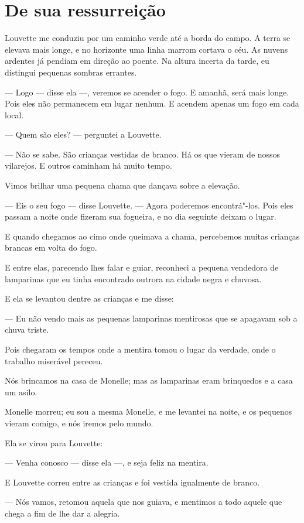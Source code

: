 \section*{De sua ressurreição}

Louvette me conduziu por um caminho verde até a borda do campo. A terra
se elevava mais longe, e no horizonte uma linha marrom cortava o céu. As
nuvens ardentes já pendiam em direção ao poente. Na altura incerta da
tarde, eu distingui pequenas sombras errantes.

--- Logo --- disse ela ---, veremos se acender o fogo. E amanhã, será mais
longe. Pois eles não permanecem em lugar nenhum. E acendem apenas um
fogo em cada local.

--- Quem são eles? --- perguntei a Louvette.

--- Não se sabe. São crianças vestidas de branco. Há os que vieram de
nossos vilarejos. E outros caminham há muito tempo.

Vimos brilhar uma pequena chama que dançava sobre a elevação.

--- Eis o seu fogo --- disse Louvette. --- Agora poderemos encontrá"-los. Pois
eles passam a noite onde fizeram sua fogueira, e no dia seguinte deixam o
lugar.

E quando chegamos ao cimo onde queimava a chama, percebemos muitas
crianças brancas em volta do fogo.

E entre elas, parecendo lhes falar e guiar, reconheci a pequena
vendedora de lamparinas que eu tinha encontrado outrora na cidade negra e
chuvosa.

E ela se levantou dentre as crianças e me disse:

--- Eu não vendo mais as pequenas lamparinas mentirosas que se apagavam
sob a chuva triste.

Pois chegaram os tempos onde a mentira tomou o lugar da verdade, onde o
trabalho miserável pereceu.

Nós brincamos na casa de Monelle; mas as lamparinas eram brinquedos e a
casa um asilo.

Monelle morreu; eu sou a mesma Monelle, e me levantei na noite, e os
pequenos vieram comigo, e nós iremos pelo mundo.

Ela se virou para Louvette:

--- Venha conosco --- disse ela ---, e seja feliz na mentira.

E Louvette correu entre as crianças e foi vestida igualmente de branco.

--- Nós vamos, retomou aquela que nos guiava, e mentimos a todo aquele
que chega a fim de lhe dar a alegria.

